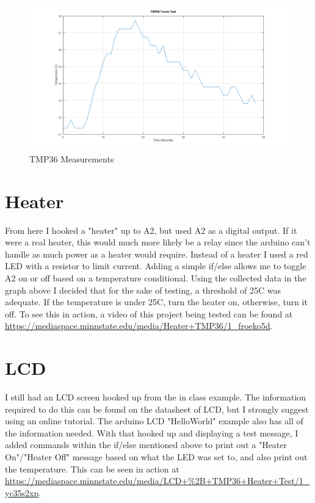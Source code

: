 \documentclass[prb,preprint]{revtex4-1}
\begin{document}
\begin{figure}[H]
	\centering
	\includegraphics[width=5.75in]{graph.png}
	\caption{TMP36 Measurements}
	\label{fig1}
\end{figure}

\section{Heater}
From here I hooked a "heater" up to A2, but used A2 as a digital output. If it were a real heater, this would much more likely be a relay since the arduino can't handle as much power as a heater would require. Instead of a heater I used a red LED with a resistor to limit current. Adding a simple if/else allows me to toggle A2 on or off based on a temperature conditional. Using the collected data in the graph above I decided that for the sake of testing, a threshold of 25C was adequate. If the temperature is under 25C, turn the heater on, otherwise, turn it off. To see this in action, a video of this project being tested can be found at \url{https://mediaspace.minnstate.edu/media/Heater+TMP36/1_froeko5d}.

\section{LCD}
I still had an LCD screen hooked up from the in class example. The information required to do this can be found on the datasheet of LCD, but I strongly suggest using an online tutorial. The arduino LCD "HelloWorld" example also has all of the information needed.
With that hooked up and displaying a test message, I added commands within the if/else mentioned above to print out a "Heater On"/"Heater Off" message based on what the LED was set to, and also print out the temperature. This can be seen in action at \url{https://mediaspace.minnstate.edu/media/LCD+%2B+TMP36+Heater+Test/1_yc35s2xp}.
\end{document}
